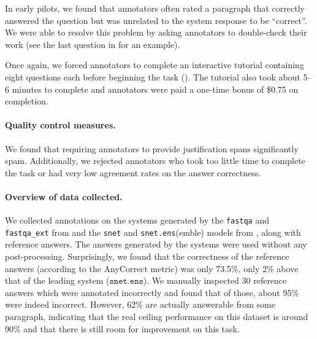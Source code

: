 In early pilots, we found that annotators often rated a paragraph that correctly answered the question but was unrelated to the system response to be ``correct''.
We were able to resolve this problem by asking annotators to double-check their work (see the last question in  for an example).

Once again, we forced annotators to complete an interactive tutorial containing eight questions each before beginning the task ().
The tutorial also took about 5--6 minutes to complete and annotators were paid a one-time bonus of \$0.75 on completion.

\paragraph{Quality control measures.}
We found that requiring annotators to provide justification spans significantly spam.
Additionally, we rejected annotators who took too little time to complete the task or had very low agreement rates on the answer correctness.



\paragraph{Overview of data collected.}
We collected annotations on the systems generated by the \texttt{fastqa} and
\texttt{fastqa\_ext} from \citet{weissenborn2017fastqa} and the \texttt{snet} and \texttt{snet.ens}(emble) models from \citet{tan2018s}, along with reference answers.
The answers generated by the systems were used without any post-processing.
Surprisingly, we found that the correctness of the reference answers (according to the AnyCorrect metric) was only 73.5\%,
only 2\% above that of the leading system ($\texttt{snet.ens}$).
We manually inspected 30 reference answers which were annotated incorrectly and found that of those, 
about 95\% were indeed incorrect.
However, 62\% are actually answerable from some paragraph,
indicating that the real ceiling performance on this dataset is around 90\% and
that there is still room for improvement on this task.
